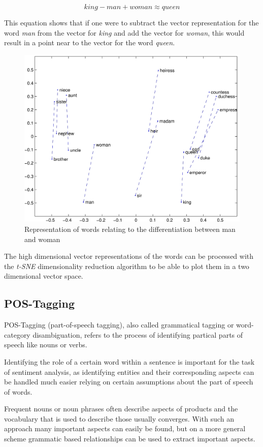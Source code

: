 \documentclass[10pt,a4paper]{article}
\begin{document}
		\begin{displaymath}
			king-man+woman \approx queen
		\end{displaymath}
		
		This equation shows that if one were to subtract the vector representation for the word \textit{man} from the vector for \textit{king} and add the vector for \textit{woman}, this would result in a point near to the vector for the word \textit{queen}.
		
		\begin{figure}[h]
			\centering
			\includegraphics[width=0.8\linewidth]{data/man_woman}
			\caption{Representation of words relating to the differentiation between man and woman}
		\end{figure}
		
		The high dimensional vector representations of the words can be processed with the \textit{t-SNE} dimensionality reduction algorithm to be able to plot them in a two dimensional vector space.
		
		\subsection{POS-Tagging}

		POS-Tagging (part-of-speech tagging), also called grammatical tagging or word-category disambiguation, refers to the process of identifying partical parts of speech like nouns or verbs. 

		Identifying the role of a certain word within a sentence is important for the task of sentiment analysis, as identifying entities and their corresponding aspects can be handled much easier relying on certain assumptions about the part of speech of words.

		Frequent nouns or noun phrases often describe aspects of products and the vocabulary that is used to describe those usually converges. With such an approach many important aspects can easily be found, but on a more general scheme grammatic based relationships can be used to extract important aspects.
\end{document}
